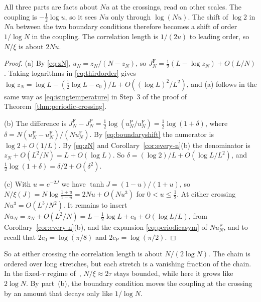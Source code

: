 All three parts are facts about $Nu$ at the crossings, read on other scales.
The coupling is $-\frac12\log u$, so it sees $Nu$ only through $\log(Nu)$. The
shift of $\log2$ in $Nu$ between the two boundary conditions therefore becomes
a shift of order $1/\log N$ in the coupling. The correlation length is
$1/(2u)$ to leading order, so $N/\xi$ is about $2Nu$.

\begin{proof}
(a) By \eqref{eq:zN}, $u_N=z_N/(N-z_N)$, so
$J_N^{\mathrm F}=\frac12(L-\log z_N)+O(L/N)$. Taking logarithms in
\eqref{eq:thirdorder} gives
$\log z_N=\log L-(\frac12\log L-c_0)/L+O((\log L)^2/L^2)$, and (a) follows in
the same way as \eqref{eq:isingtemperature} in Step~3 of the proof of
Theorem~\ref{thm:periodic-crossing}.

(b) The difference is $J_N^{\mathrm F}-J_N^{\mathrm P}
=\frac12\log(u_N^{\mathrm P}/u_N^{\mathrm F})=\frac12\log(1+\delta)$, where
$\delta=N(u_N^{\mathrm P}-u_N^{\mathrm F})/(Nu_N^{\mathrm F})$. By
\eqref{eq:boundaryshift} the numerator is $\log2+O(1/L)$. By \eqref{eq:zN} and
Corollary~\ref{cor:every-n}(b) the denominator is $z_N+O(L^2/N)=L+O(\log L)$.
So $\delta=(\log2)/L+O(\log L/L^2)$, and
$\frac12\log(1+\delta)=\delta/2+O(\delta^2)$.

(c) With $u=e^{-2J}$ we have $\tanh J=(1-u)/(1+u)$, so
$N/\xi(J)=N\log\frac{1+u}{1-u}=2Nu+O(Nu^3)$ for $0<u\le\frac12$. At either
crossing $Nu^3=O(L^3/N^2)$. It remains to insert
$Nu_N=z_N+O(L^2/N)=L-\frac12\log L+c_0+O(\log L/L)$, from
Corollary~\ref{cor:every-n}(b), and the expansion \eqref{eq:periodicasym} of
$Nu_N^{\mathrm P}$, and to recall that $2c_0=\log(\pi/8)$ and
$2c_{\mathrm P}=\log(\pi/2)$.
\end{proof}

So at either crossing the correlation length is about $N/(2\log N)$. The chain
is ordered over long stretches, but each stretch is a vanishing fraction of the
chain. In the fixed-$\tau$ regime of~\cite{antal2004}, $N/\xi\approx2\tau$
stays bounded, while here it grows like $2\log N$. By part~(b), the boundary
condition moves the coupling at the crossing by an amount that decays only
like $1/\log N$.


